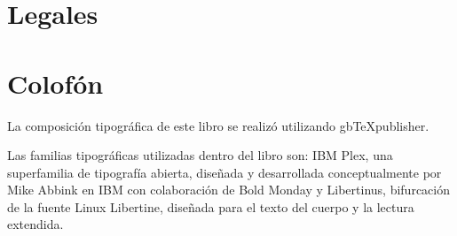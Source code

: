 \documentclass{book}
\begin{document}
\lipsum[1]

\backmatter

\chapter{Legales}

\lipsum[4]

\chapter{Colofón}

La composición tipográfica de este libro se realizó utilizando gbTeXpublisher.

Las familias tipográficas utilizadas dentro del libro son: IBM Plex, una superfamilia de tipografía abierta, diseñada y desarrollada conceptualmente por Mike Abbink en IBM con colaboración de Bold Monday y Libertinus, bifurcación de la fuente Linux Libertine, diseñada para el texto del cuerpo y la lectura extendida.
\end{document}
